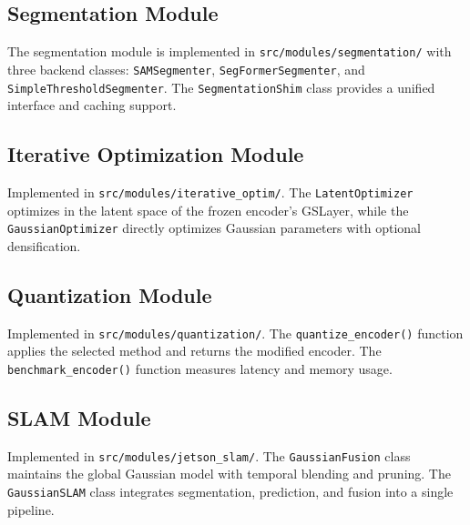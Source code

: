\documentclass[10pt,twocolumn,letterpaper]{article}
\begin{document}
\subsection{Segmentation Module}
The segmentation module is implemented in \texttt{src/modules/segmentation/}
with three backend classes: \texttt{SAMSegmenter}, \texttt{SegFormerSegmenter},
and \texttt{SimpleThresholdSegmenter}. The \texttt{SegmentationShim} class
provides a unified interface and caching support.

\subsection{Iterative Optimization Module}
Implemented in \texttt{src/modules/iterative\_optim/}. The
\texttt{LatentOptimizer} optimizes in the latent space of the frozen
encoder's GSLayer, while the \texttt{GaussianOptimizer} directly
optimizes Gaussian parameters with optional densification.

\subsection{Quantization Module}
Implemented in \texttt{src/modules/quantization/}. The
\texttt{quantize\_encoder()} function applies the selected method and
returns the modified encoder. The \texttt{benchmark\_encoder()} function
measures latency and memory usage.

\subsection{SLAM Module}
Implemented in \texttt{src/modules/jetson\_slam/}. The \texttt{GaussianFusion}
class maintains the global Gaussian model with temporal blending and
pruning. The \texttt{GaussianSLAM} class integrates segmentation,
prediction, and fusion into a single pipeline.
\end{document}
